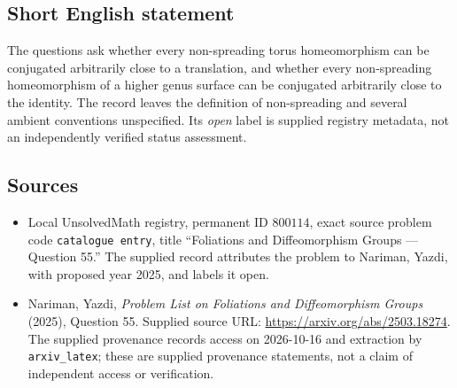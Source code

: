 \documentclass[11pt]{article}
\begin{document}
\subsection{Short English statement}
The questions ask whether every non-spreading torus homeomorphism can be conjugated arbitrarily close to a translation, and whether every non-spreading homeomorphism of a higher genus surface can be conjugated arbitrarily close to the identity. The record leaves the definition of non-spreading and several ambient conventions unspecified. Its \emph{open} label is supplied registry metadata, not an independently verified status assessment.
\subsection{Sources}
\begin{itemize}
\item Local UnsolvedMath registry, permanent ID \(800114\), exact source problem code \texttt{catalogue entry}, title ``Foliations and Diffeomorphism Groups --- Question 55.'' The supplied record attributes the problem to Nariman, Yazdi, with proposed year 2025, and labels it open.
\item Nariman, Yazdi, \emph{Problem List on Foliations and Diffeomorphism Groups} (2025), Question 55. Supplied source URL: \url{https://arxiv.org/abs/2503.18274}. The supplied provenance records access on 2026-10-16 and extraction by \texttt{arxiv\_latex}; these are supplied provenance statements, not a claim of independent access or verification.
\end{itemize}
\end{document}
